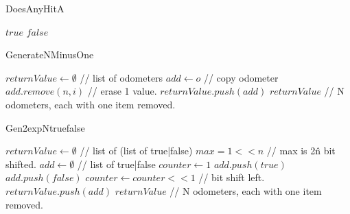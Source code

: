 \begin{algorithm}
	\caption{DoesAnyHitA}\label{DoesAnyHitA}
	\begin{algorithmic}[1]
		\State \Return $true$
		\EndIf
		\EndFor
		\State \Return $false$
		\EndFunction
	\end{algorithmic}
\end{algorithm}


\begin{algorithm}
	\caption{GenerateNMinusOne}\label{GenerateNMinusOne}
	\begin{algorithmic}[1]
		\State $returnValue \gets \emptyset$ // list of odometers
		\State $add \gets o$  // copy odometer
		\State $add.remove(n,i)$ // erase 1 value.
		\State $returnValue.push(add)$ 
		\EndFor
		\State \Return $returnValue$ // N odometers, each with one item removed. 
		\EndFunction
	\end{algorithmic}
\end{algorithm}


\begin{algorithm}
	\caption{Gen2expNtruefalse}\label{Gen2expNtruefalse}
	\begin{algorithmic}[1]
		\State $returnValue \gets \emptyset$ // list of (list of true|false)
		\State $max = 1 << n$ // max is 2\^n bit shifted.
		\State $add \gets \emptyset$ // list of true|false
		\State $counter \gets 1$
		\State $add.push(true)$
		\Else
		\State $add.push(false)$
		\EndIf
		\State $counter \gets counter << 1$ // bit shift left.
		\EndWhile
		\State $returnValue.push(add)$ 
		\EndFor
		\State \Return $returnValue$ // N odometers, each with one item removed. 
		\EndFunction
	\end{algorithmic}
\end{algorithm}


